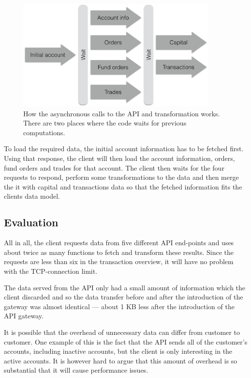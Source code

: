 \documentclass{cslthse-msc}
\begin{document}
\begin{figure}[H]
  \centering
    \begin{center}
      \includegraphics[width=0.9\textwidth]{images/bank_overview.png}
    \end{center}
  \caption{How the asynchronous calls to the API and transformation works. There are two places where the code waits for previous computations.}
\end{figure}

To load the required data, the initial account information has to be fetched first. Using that response, the client will then load the account information, orders, fund orders and trades for that account. The client then waits for the four requests to respond, perform some transformations to the data and then merge the it with capital and transactions data so that the fetched information fits the clients data model.

\subsection{Evaluation}
All in all, the client requests data from five different API end-points and uses about twice as many functions to fetch and transform these results. Since the requests are less than six in the transaction overview, it will have no problem with the TCP-connection limit.

The data served from the API only had a small amount of information which the client discarded and so the data transfer before and after the introduction of the gateway was almost identical --- about 1 KB less after the introduction of the API gateway.

It is possible that the overhead of unnecessary data can differ from customer to customer. One example of this is the fact that the API sends all of the customer's accounts, including inactive accounts, but the client is only interesting in the active accounts. It is however hard to argue that this amount of overhead is so substantial that it will cause performance issues.
\end{document}

